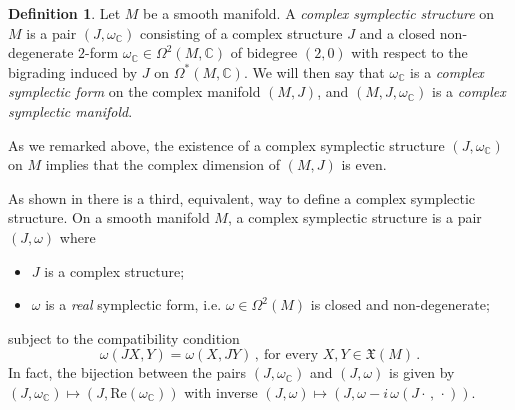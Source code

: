 \documentclass[a4paper]{amsart}
\theoremstyle{definition}
\newtheorem{definition}[theorem]{Definition}
\theoremstyle{remark}
\numberwithin{equation}{section}
\begin{document}
\begin{definition}
Let $M$ be a smooth manifold. A \emph{complex symplectic structure} on $M$ is a pair $(J,\omega_{\mathbb C})$ consisting of a complex structure $J$ and a closed non-degenerate $2$-form $\omega_{\mathbb C}\in\Omega^2(M,\mathbb C)$ of bidegree $(2,0)$ with respect to the bigrading induced by $J$ on $\Omega^*(M,\mathbb C)$. We will then say that $\omega_{\mathbb C}$ is a \emph{complex symplectic form} on the complex manifold $(M,J)$, and $(M,J,\omega_{\mathbb C})$ is a \emph{complex symplectic manifold}.
\end{definition}

As we remarked above, the existence of a complex symplectic structure $(J,\omega_{\mathbb C})$ on $M$ implies that the complex dimension of $(M,J)$ is even. 

As shown in \cite[Lemma 3.2]{bazzoni-freibert-latorre-meinke} there is a third, equivalent, way to define a complex symplectic structure. On a smooth manifold $M$, a complex symplectic structure is a pair $(J,\omega)$ where
\begin{itemize}
    \item $J$ is a complex structure;
    \item $\omega$ is a {\em real} symplectic form, i.e. $\omega\in\Omega^2(M)$ is closed and non-degenerate;
\end{itemize}
subject to the compatibility condition
\[
\omega(JX,Y)=\omega(X,JY)\,, \ \textrm{for every }X,Y\in\mathfrak X(M)\,.
\]
In fact, the bijection between the pairs $(J,\omega_{\mathbb C})$ and $(J,\omega)$ is given by $(J,\omega_{\mathbb C})\mapsto (J,\mathrm{Re}(\omega_{\mathbb C}))$ with inverse $(J,\omega)\mapsto (J,\omega-i\,\omega(J\cdot\,,\,\cdot))$.
\end{document}
